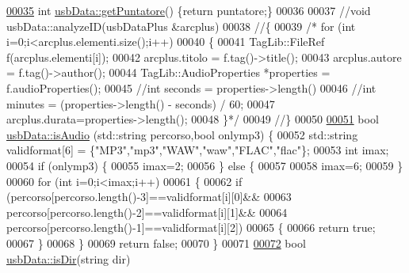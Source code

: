 \begin{DoxyCode}
\hypertarget{usbData_8cpp_source_l00035}{}\hyperlink{classusbData_a3d872ce11202a145b83f0791d7eefebb}{00035} \textcolor{keywordtype}{int} \hyperlink{classusbData_a3d872ce11202a145b83f0791d7eefebb}{usbData::getPuntatore}() \{\textcolor{keywordflow}{return} puntatore;\}
00036 
00037 \textcolor{comment}{//void usbData::analyzeID(usbDataPlus &arcplus)}
00038 \textcolor{comment}{//\{}
00039 \textcolor{comment}{/*  for (int i=0;i<arcplus.elementi.size();i++)}
00040 \textcolor{comment}{    \{}
00041 \textcolor{comment}{        TagLib::FileRef f(arcplus.elementi[i]);}
00042 \textcolor{comment}{        arcplus.titolo = f.tag()->title();}
00043 \textcolor{comment}{        arcplus.autore = f.tag()->author();}
00044 \textcolor{comment}{        TagLib::AudioProperties *properties = f.audioProperties();}
00045 \textcolor{comment}{        //int seconds = properties->length() %
00046 \textcolor{comment}{        //int minutes = (properties->length() - seconds) / 60;}
00047 \textcolor{comment}{        arcplus.durata=properties->length();}
00048 \textcolor{comment}{    \}*/}
00049 \textcolor{comment}{//\}}
00050 
\hypertarget{usbData_8cpp_source_l00051}{}\hyperlink{classusbData_a7405fda9e90402594fe24dc091bad0ec}{00051} \textcolor{keywordtype}{bool} \hyperlink{classusbData_a7405fda9e90402594fe24dc091bad0ec}{usbData::isAudio} (std::string percorso,\textcolor{keywordtype}{bool} onlymp3) \{
00052     std::string validformat[6] = \{\textcolor{stringliteral}{"MP3"},\textcolor{stringliteral}{"mp3"},\textcolor{stringliteral}{"WAW"},\textcolor{stringliteral}{"waw"},\textcolor{stringliteral}{"FLAC"},\textcolor{stringliteral}{"flac"}\};
00053     \textcolor{keywordtype}{int} imax;
00054     \textcolor{keywordflow}{if} (onlymp3) \{
00055         imax=2;
00056     \} \textcolor{keywordflow}{else} \{
00057 
00058         imax=6;
00059     \}
00060     \textcolor{keywordflow}{for} (\textcolor{keywordtype}{int} i=0;i<imax;i++)
00061         \{
00062             \textcolor{keywordflow}{if} (percorso[percorso.length()-3]==validformat[i][0]&&
00063                     percorso[percorso.length()-2]==validformat[i][1]&&
00064                     percorso[percorso.length()-1]==validformat[i][2])
00065                     \{
00066                         \textcolor{keywordflow}{return} \textcolor{keyword}{true};
00067                     \}
00068         \}
00069     \textcolor{keywordflow}{return} \textcolor{keyword}{false};
00070 \}
00071 
\hypertarget{usbData_8cpp_source_l00072}{}\hyperlink{classusbData_a2b695019bdabc6eed11dafaa7c959029}{00072} \textcolor{keywordtype}{bool} \hyperlink{classusbData_a2b695019bdabc6eed11dafaa7c959029}{usbData::isDir}(\textcolor{keywordtype}{string} dir)
}
\end{DoxyCode}
